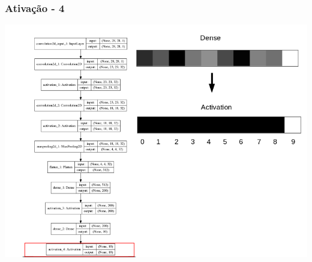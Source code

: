 \documentclass[tikz,10pt]{beamer}
\begin{document}
\begin{frame}
	\frametitle{Ativação - 4}
	\centering
	\includegraphics[height=.8\paperheight]{images/fabio/ativ_4}
\end{frame}
\end{document}
